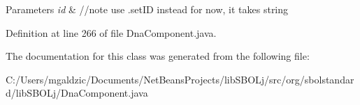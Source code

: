 \begin{DoxyParams}{Parameters}
{\em id} & //note use .setID instead for now, it takes string \\
\hline
\end{DoxyParams}


Definition at line 266 of file DnaComponent.java.



The documentation for this class was generated from the following file:\begin{DoxyCompactItemize}
\item 
C:/Users/mgaldzic/Documents/NetBeansProjects/libSBOLj/src/org/sbolstandard/libSBOLj/DnaComponent.java\end{DoxyCompactItemize}
